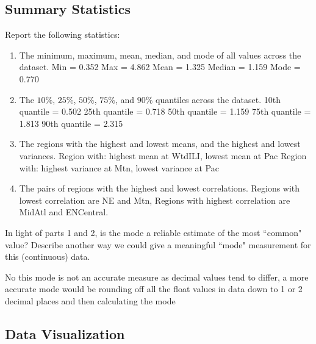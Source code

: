 \documentclass{article}
\def\blu#1{{\color{blu}#1}}
\def\enum#1{\begin{enumerate}#1\end{enumerate}}
\begin{document}
\subsection{Summary Statistics}

\blu{Report the following statistics}:
\enum{
\item The minimum, maximum, mean, median, and mode of all values across the dataset.
\newline Min = 0.352	Max = 4.862	Mean = 1.325	Median = 1.159	Mode = 0.770
\item The $10\%$, $25\%$, $50\%$, $75\%$, and $90\%$ quantiles across the dataset.
\newline 10th quantile = 0.502	25th quantile = 0.718	50th quantile = 1.159	75th quantile = 1.813	90th quantile = 2.315
\item The regions with the highest and lowest means, and the highest and lowest variances.
\newline Region with:	highest mean at WtdILI,		lowest mean at Pac
\newline Region with:	highest variance at Mtn, 	lowest variance at Pac
\item The pairs of regions with the highest and lowest correlations.
\newline Regions with lowest correlation are NE and Mtn,
\newline Regions with highest correlation are MidAtl and ENCentral.
}
In light of parts 1 and 2, \blu{is the mode a reliable estimate of the most ``common" value? Describe another way we could give a meaningful ``mode" measurement for this (continuous) data.}

No this mode is not an accurate measure as decimal values tend to differ, a more accurate mode would be rounding off all the float values in data down to 1 or 2 decimal places and then calculating the mode


\subsection{Data Visualization}
\end{document}

